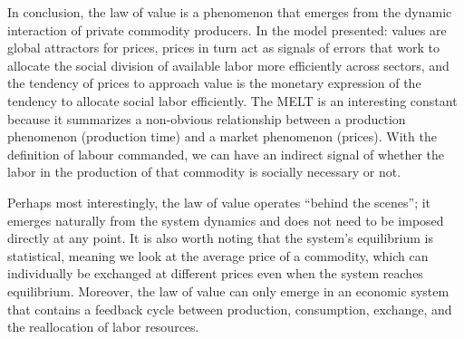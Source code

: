 In conclusion, the law of value is a phenomenon that emerges from the dynamic interaction of private commodity producers. In the model presented: values are global attractors for prices, prices in turn act as signals of errors that work to allocate the social division of available labor more efficiently across sectors, and the tendency of prices to approach value is the monetary expression of the tendency to allocate social labor efficiently. The MELT is an interesting constant because it summarizes a non-obvious relationship between a production phenomenon (production time) and a market phenomenon (prices). With the definition of labour commanded, we can have an indirect signal of whether the labor in the production of that commodity is socially necessary or not.

Perhaps most interestingly, the law of value operates “behind the scenes”; it emerges naturally from the system dynamics and does not need to be imposed directly at any point. It is also worth noting that the system’s equilibrium is statistical, meaning we look at the average price of a commodity, which can individually be exchanged at different prices even when the system reaches equilibrium. Moreover, the law of value can only emerge in an economic system that contains a feedback cycle between production, consumption, exchange, and the reallocation of labor resources.

